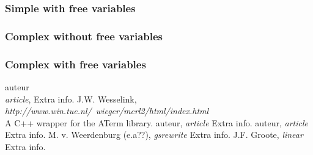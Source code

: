 \index{}\documentclass[a4paper,10pt]{article}
\theoremstyle{plain}
\theoremstyle{definition}
\begin{document}
\subsubsection{Simple with free variables}

\subsubsection{Complex without free variables}

\subsubsection{Complex with free variables}

\newpage
\begin{thebibliography}{99}   auteur\\
   \textit{article},
   Extra info.
   J.W. Wesselink,
   \textit{http://www.win.tue.nl/~wieger/mcrl2/html/index.html}\\
   A C++ wrapper for the ATerm library.
   auteur,
   \textit{article}
   Extra info.
   auteur,
   \textit{article}
   Extra info.
   M. v. Weerdenburg (e.a??),
   \textit{gsrewrite}
   Extra info.
   J.F. Groote,
   \textit{linear}
   Extra info.

\end{thebibliography}

\newpage
\end{document}
